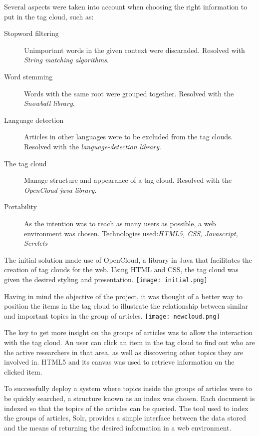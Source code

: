 \documentclass[a0paper, portrait]{baposter}
\begin{document}
\begin{poster}
   {
    Several aspects were taken into account when choosing the right information to put in the tag cloud, such as: \newline
    \begin{description}
    \item[Stopword filtering] Unimportant words in the given context were discaraded. Resolved with {\em String matching algorithms}.
    \item[Word stemming] Words with the same root were grouped together. Resolved with the {\em Snowball library}.
    \item[Language detection] Articles in other languages were to be excluded from the tag clouds. Resolved with the {\em language-detection library}.
    \item[The tag cloud] Manage structure and appearance of a tag cloud. Resolved with the {\em OpenCloud java library}.
    \item[Portability] As the intention was to reach as many users as possible, a web environment was chosen. Technologies used:{\em HTML5, CSS, Javascript, Servlets}
    \end{description}
  }
   {
    The initial solution made use of OpenCloud, a library in Java that facilitates the creation of tag clouds for the web. Using HTML and CSS, the tag cloud was given the desired styling and presentation.
    \newline
    \texttt{[image: initial.png]}
  }

   {
    Having in mind the objective of the project, it was thought of a better way to position the items in the tag cloud to illustrate the relationship between similar and important topics in the group of articles. 
    \newline
    \texttt{[image: newcloud.png]}
  }

   {
    The key to get more insight on the groups of articles was to allow the interaction with the tag cloud. An user can click an item in the tag cloud to find out who are the active researchers in that area, as well as discovering other topics they are involved in. HTML5 and its canvas was used to retrieve information on the clicked item.    
  }

   {
To successfully deploy a system where topics inside the groups of articles were to be quickly searched, a structure known as an index was chosen. Each document is indexed so that the topics of the articles can be queried. 
The tool used to index the groups of articles, Solr, provides a simple interface between the data stored and the means of returning the desired information in a web environment.
  }
  

\end{poster}
\end{document}
